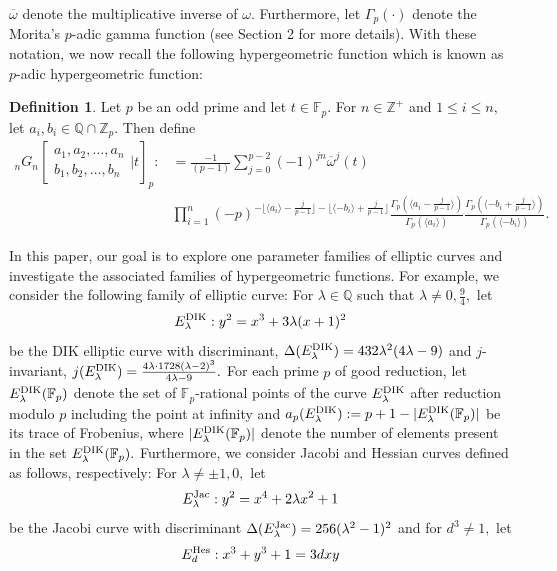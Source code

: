 \documentclass[12pt]{amsart}
\theoremstyle{plain}
\theoremstyle{definition}
\newtheorem{definition}[theorem]{Definition}
\theoremstyle{remark}
\newcommand{\Q}{\mathbb{Q}}
\newcommand{\F}{\mathbb{F}}
\newcommand{\hes}{\text{{\rm{Hes}}}}
\newcommand{\jac}{\text{{\rm{Jac}}}}
\newcommand{\dik}{\text{{\rm{DIK}}}}
\numberwithin{equation}{section}
\begin{document}
	$\overline{\omega}$ denote the multiplicative inverse of $\omega.$ Furthermore, let $\Gamma_p(\cdot)$ denote the Morita's $p$-adic gamma function (see Section 2 for more details). With these notation, we now recall the following hypergeometric function which is known as $p$-adic hypergeometric function:
	\begin{definition}\cite[Definition 1.1]{McCarthyPJM} 
	 Let $p$ be an odd prime and let $t\in \mathbb{F}_p$. For $n\in\mathbb{Z}^+$ and $1\leq i\leq n,$ let 
    $a_i,b_i \in \mathbb{Q}\cap \mathbb{Z}_p $. Then define
    \begin{align*}
        {_nG_n}\left[\begin{array}{cc}
        a_1,    a_2, \dots,a_n   \\ b_1,   b_2, \dots,b_n
       \end{array}|t\right]_p :&=\frac{-1}{(p-1)} \sum_{j=0}^{p-2}(-1)^{jn}\overline{\omega}^{j}(t)\\& \prod_{i=1}^{n}(-p)^{-\lfloor\langle a_i\rangle-\frac{j}{p-1}\rfloor-\lfloor\langle-b_i\rangle+\frac{j}{p-1}\rfloor}
\frac{\Gamma_p(\langle a_i-\frac{j}{p-1}\rangle)}{\Gamma_p(\langle a_i\rangle)}\frac{\Gamma_p(\langle-b_i+\frac{j}{p-1}\rangle )}{\Gamma_p(\langle-b_i\rangle)} .
        \end{align*}
	\end{definition}
	In this paper, our goal is to explore one parameter families of elliptic curves and investigate the associated families of hypergeometric functions. For example, we consider the following family of elliptic curve: For $\lambda\in\Q$ such that $\lambda\neq0,\frac{9}{4},$ let 
	$$
	 E^{\dik}_{\lambda} : y^2 = x^3 + 3\lambda(x + 1)^2 
	  $$ 
	  be the DIK elliptic curve with discriminant, $\Delta(E_{\lambda}^{\dik})=432\lambda^2(4\lambda-9)$ and $j$-invariant, $j(E_{\lambda}^{\dik})=\frac{4\lambda\cdot1728(\lambda-2)^3}{4\lambda-9}.$
	For each prime $p$ of good reduction, let $E_{\lambda}^{\dik}(\F_p)$ denote the set of $\F_p$-rational points of the curve $E_{\lambda}^{\dik}$ after reduction modulo $p$ including the point at infinity and $a_p(E_{\lambda}^{\dik}):=p+1-|E_{\lambda}^{\dik}(\F_p)|$ be its trace of Frobenius, where $|E_{\lambda}^{\dik}(\F_p)|$ denote the number of elements present in the set $E_{\lambda}^{\dik}(\F_p).$ Furthermore, we consider Jacobi and Hessian curves defined as follows, respectively: For $\lambda\neq\pm1,0,$ let $$E_{\lambda}^{\jac}:y^2=x^4 + 2\lambda x^2 + 1$$ be the Jacobi curve with discriminant $\Delta(E^{\jac}_{\lambda})=256(\lambda^2-1)^2$ and for $d^3\neq1,$ let
	$$
	E^{\hes}_d: x^3+y^3+1=3dxy
	$$ 
\end{document}

